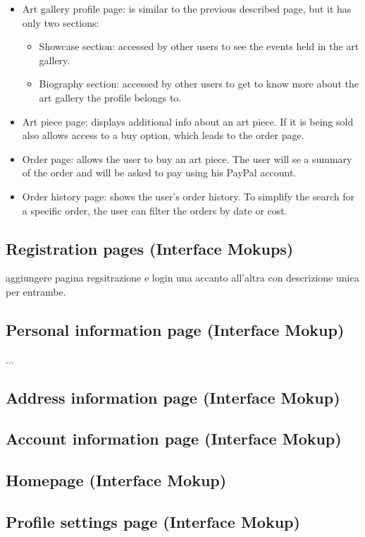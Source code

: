 \begin{itemize}
    \item Art gallery profile page: is similar to the previous described page, but it has only two sections:
    \begin{itemize}
        \item Showcase section: accessed by other users to see the events held in the art gallery.
        \item Biography section: accessed by other users to get to know more about the art gallery the profile belongs 
        to.
    \end{itemize}
    \item Art piece page: displays additional info about an art piece. If it is being sold also allows access to a buy 
    option, which leads to the order page.
    \item Order page: allows the user to buy an art piece. The user will se a summary of the order and will be asked to pay using his PayPal account.
    \item Order history page: shows the user's order history. To simplify the search for a specific order, the user can filter the orders by date or cost. 
\end{itemize}

\subsection{Registration pages (Interface Mokups)}
aggiungere pagina regsitrazione e login una accanto all'altra con descrizione unica per entrambe.
\subsection{Personal information page (Interface Mokup)}
...
\subsection{Address information page (Interface Mokup)}
\subsection{Account information page (Interface Mokup)}
\subsection{Homepage (Interface Mokup)}
\subsection{Profile settings page (Interface Mokup)}
